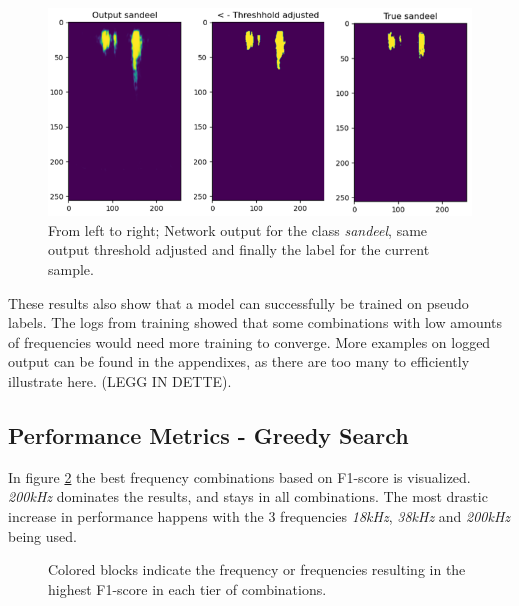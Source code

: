         \begin{figure}[H]
            \centering
            \includegraphics[scale=0.6]{figures/SANDEEL_WITH_LABEL.png}
            \caption[Examle output, threshold and label]{From left to right; Network output for the class \textit{sandeel}, same output threshold adjusted and finally the label for the current sample.}
          	\medskip 
            \label{sandeel_threshold_label}
        \end{figure}
    
    
    These results also show that a model can successfully be trained on pseudo labels. The logs from training showed that some combinations with low amounts of frequencies would need more training to converge. More examples on logged output can be found in the appendixes, as there are too many to efficiently illustrate here.  (LEGG IN DETTE). 
    
    \subsection{Performance Metrics - Greedy Search}
        In figure \ref{increasing_freq_f1_score_fig} the best frequency combinations based on F1-score is visualized. \textit{200kHz} dominates the results, and stays in all combinations. The most drastic increase in performance happens with the 3 frequencies \textit{18kHz}, \textit{38kHz} and \textit{200kHz} being used.
        \begin{figure}[H]
            \centering
            
            \caption[Best frequency combination - F1-score]{Colored blocks indicate the frequency or frequencies resulting in the highest F1-score in each tier of combinations.}
          	\medskip 
            \label{increasing_freq_f1_score_fig}
        \end{figure}

